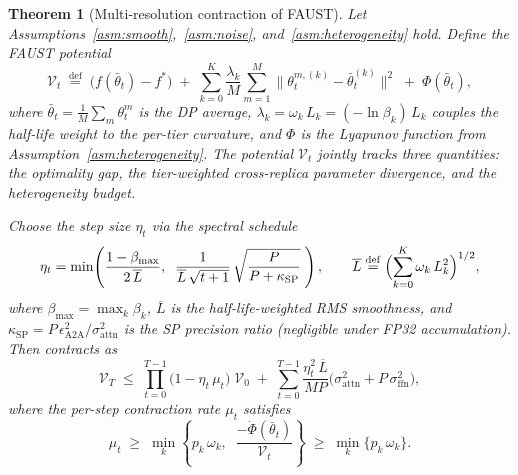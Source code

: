 \documentclass{article}
\newtheorem{theorem}{Theorem}[section]
\begin{document}
\begin{theorem}[Multi-resolution contraction of FAUST]
\label{thm:sgdm}
Let Assumptions~\ref{asm:smooth},~\ref{asm:noise},
and~\ref{asm:heterogeneity} hold. Define the \emph{FAUST potential}
\begin{equation}
\mathcal{V}_t
\;\stackrel{\mathrm{def}}{=}\;
\bigl(f(\bar{\theta}_t) - f^*\bigr)
\;+\;
\sum_{k=0}^{K} \frac{\lambda_k}{M}\sum_{m=1}^{M}
\bigl\|\theta_t^{m,(k)} - \bar{\theta}_t^{(k)}\bigr\|^2
\;+\;
\Phi(\bar{\theta}_t),
\label{eq:step_size}
\end{equation}
where $\bar{\theta}_t = \frac{1}{M}\sum_m \theta_t^m$ is the DP average,
$\lambda_k = \omega_k\,L_k = (-\ln\beta_k)\,L_k$ couples the
half-life weight to the per-tier curvature, and $\Phi$ is the
Lyapunov function from Assumption~\ref{asm:heterogeneity}.
The potential $\mathcal{V}_t$ jointly tracks three quantities: the
optimality gap, the tier-weighted cross-replica parameter divergence,
and the heterogeneity budget.

Choose the step size $\eta_t$ via the \emph{spectral schedule}
\begin{equation}
\eta_t
= \min\!\left(
\frac{1 - \beta_{\max}}{2\,\overline{L}},\;\;
\frac{1}{\overline{L}\,\sqrt{t+1}}\,
\sqrt{\frac{P}{P + \kappa_{\mathrm{SP}}}}\;
\right),
\qquad
\overline{L} \stackrel{\mathrm{def}}{=}
\Bigl(\sum_{k=0}^{K}\omega_k\,L_k^2\Bigr)^{1/2},
\label{eq:eta_spectral}
\end{equation}
where $\beta_{\max} = \max_k \beta_k$,
$\overline{L}$ is the half-life-weighted RMS smoothness, and
$\kappa_{\mathrm{SP}} = P\,\epsilon_{\mathrm{A2A}}^2 / \sigma_{\mathrm{attn}}^2$
is the SP precision ratio (negligible under FP32 accumulation). Then contracts as
\begin{equation}
\mathcal{V}_T
\;\leq\;
\prod_{t=0}^{T-1}\bigl(1 - \eta_t\,\mu_t\bigr)\;\mathcal{V}_0
\;+\;
\sum_{t=0}^{T-1}\frac{\eta_t^2\,\overline{L}}{MP}
\bigl(\sigma_{\mathrm{attn}}^2 + P\,\sigma_{\mathrm{ffn}}^2\bigr),
\label{eq:rate}
\end{equation}
where the \emph{per-step contraction rate} $\mu_t$ satisfies
\begin{equation}
\mu_t
\;\geq\;
\min_{k}\!\left\{
p_k\,\omega_k,\;\;
\frac{-\dot{\Phi}(\bar{\theta}_t)}{\mathcal{V}_t}
\right\}
\;\geq\;
\min_{k}\{p_k\,\omega_k\}.
\label{eq:contraction_rate}
\end{equation}
\end{theorem}

\end{document}
